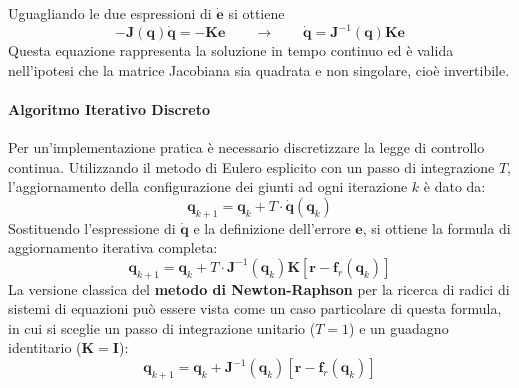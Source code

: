 ﻿\documentclass[11pt, a4paper]{article}
\begin{document}
Uguagliando le due espressioni di \(\dot{\bm{e}}\) si ottiene
\[
    - \bm{J}(\bm{q}) \dot{\bm{q}} = -\bm{K} \bm{e}
    \qquad\longrightarrow\qquad
    \dot{\bm{q}} = \bm{J}^{-1}(\bm{q}) \bm{K} \bm{e}
\]
Questa equazione rappresenta la soluzione in tempo continuo ed è valida nell'ipotesi che la matrice Jacobiana sia quadrata e non singolare, cioè invertibile.


\paragraph{Algoritmo Iterativo Discreto}
Per un'implementazione pratica è necessario discretizzare la legge di controllo continua. Utilizzando il metodo di Eulero esplicito con un passo di integrazione \(T\), l'aggiornamento della configurazione dei giunti ad ogni iterazione \(k\) è dato da:
\[
    \bm{q}_{k+1} = \bm{q}_k + T \cdot \dot{\bm{q}}(\bm{q}_k)
\]
Sostituendo l'espressione di \(\dot{\bm{q}}\) e la definizione dell'errore \(\bm{e}\), si ottiene la formula di aggiornamento iterativa completa:
\[
    \bm{q}_{k+1} = \bm{q}_k + T \cdot \bm{J}^{-1}(\bm{q}_k) \bm{K} \left[ \bm{r} - \bm{f}_r(\bm{q}_k) \right]
\]
La versione classica del \textbf{metodo di Newton-Raphson} per la ricerca di radici di sistemi di equazioni può essere vista come un caso particolare di questa formula, in cui si sceglie un passo di integrazione unitario (\(T=1\)) e un guadagno identitario (\(\bm{K}=\bm{I}\)):
\[
    \bm{q}_{k+1} = \bm{q}_k + \bm{J}^{-1}(\bm{q}_k) \left[ \bm{r} - \bm{f}_r(\bm{q}_k) \right]
\]
\end{document}
